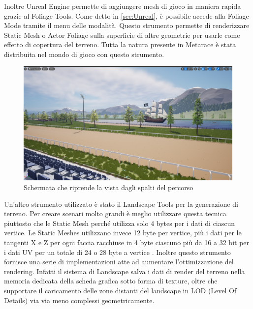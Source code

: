     Inoltre Unreal Engine permette di aggiungere mesh di gioco in maniera rapida grazie al Foliage Tools.
    Come detto in \ref{sec:Unreal}, è possibile accede alla Foliage Mode tramite il menu delle modalità.
    Questo strumento permette di renderizzare Static Mesh o Actor Foliage sulla superficie di altre geometrie per usarle come effetto di copertura del terreno.
    Tutta la natura presente in Metarace è stata distribuita nel mondo di gioco con questo strumento.

    \begin{figure}[b]
        \centering
        \includegraphics[width=.9\textwidth]{figure/NaveDaSpaltiCropped.png}
        \caption{Schermata che riprende la vista dagli spalti del percorso}
    \end{figure}

    Un'altro strumento utilizzato è stato il Landscape Tools per la generazione di terreno.
    Per creare scenari molto grandi è meglio utilizzare questa tecnica piuttosto che le Static Mesh perché utilizza solo 4 bytes per i dati di ciascun vertice.
    Le Static Meshes utilizzano invece 12 byte per vertice, più i dati per le tangenti X e Z per ogni faccia racchiuse in 4 byte ciascuno più  da 16 a 32 bit per i dati UV per un totale di 24 o 28 byte a vertice \cite{ULandscape}.
    Inoltre questo strumento fornisce una serie di implementazioni atte ad aumentare l'ottimizzazione del rendering.
    Infatti il sistema di Landscape salva i dati di render del terreno nella memoria dedicata della scheda grafica sotto forma di texture, oltre che supportare il caricamento delle zone distanti del landscape in LOD (Level Of Details) via via meno complessi geometricamente.

    
    




